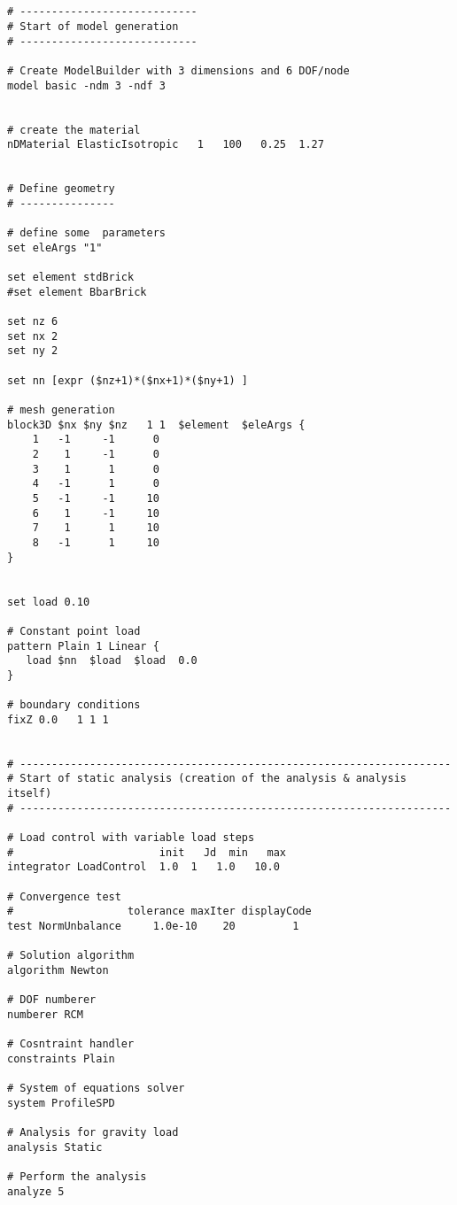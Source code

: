 \documentclass[12pt]{article}
\begin{document}
\vspace{0.2in} 
{\sf\small
\begin{verbatim}


# ----------------------------
# Start of model generation
# ----------------------------

# Create ModelBuilder with 3 dimensions and 6 DOF/node
model basic -ndm 3 -ndf 3


# create the material
nDMaterial ElasticIsotropic   1   100   0.25  1.27


# Define geometry
# ---------------

# define some  parameters
set eleArgs "1" 

set element stdBrick
#set element BbarBrick

set nz 6
set nx 2 
set ny 2

set nn [expr ($nz+1)*($nx+1)*($ny+1) ]

# mesh generation
block3D $nx $ny $nz   1 1  $element  $eleArgs {
    1   -1     -1      0
    2    1     -1      0
    3    1      1      0
    4   -1      1      0 
    5   -1     -1     10
    6    1     -1     10
    7    1      1     10
    8   -1      1     10
}


set load 0.10

# Constant point load
pattern Plain 1 Linear {
   load $nn  $load  $load  0.0
}

# boundary conditions
fixZ 0.0   1 1 1 


# --------------------------------------------------------------------
# Start of static analysis (creation of the analysis & analysis itself)
# --------------------------------------------------------------------

# Load control with variable load steps
#                       init   Jd  min   max
integrator LoadControl  1.0  1   1.0   10.0

# Convergence test
#                  tolerance maxIter displayCode
test NormUnbalance     1.0e-10    20         1

# Solution algorithm
algorithm Newton

# DOF numberer
numberer RCM

# Cosntraint handler
constraints Plain 

# System of equations solver
system ProfileSPD

# Analysis for gravity load
analysis Static 

# Perform the analysis
analyze 5


\end{verbatim}}
\end{document}
